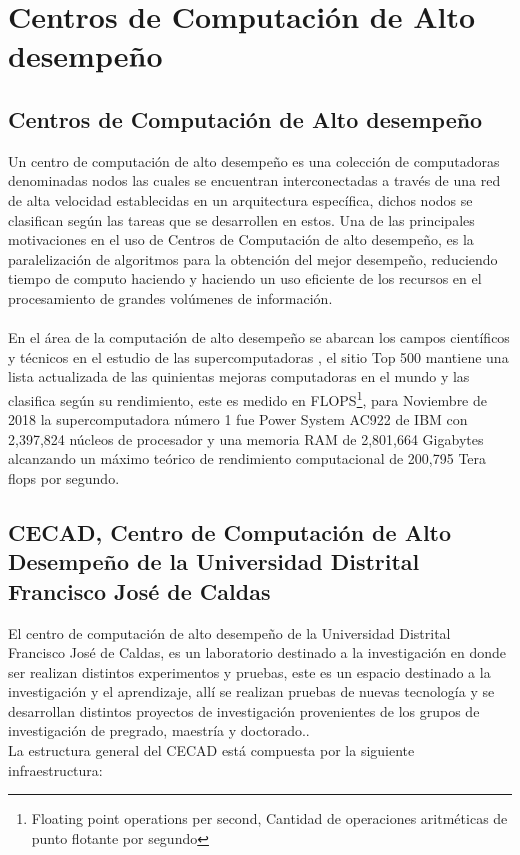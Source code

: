 \chapter{Centros de Computación de Alto desempeño}

\section{Centros de Computación de Alto desempeño}
Un centro de computación de alto desempeño es una colección de computadoras denominadas nodos las cuales se encuentran interconectadas a través de una red de alta velocidad establecidas en un arquitectura específica, dichos nodos se clasifican según las tareas que se desarrollen en estos. Una de las principales motivaciones en el uso de Centros de Computación de alto desempeño, es la paralelización de algoritmos para la obtención del mejor desempeño, reduciendo tiempo de computo haciendo y haciendo un uso eficiente de los recursos en el procesamiento de grandes volúmenes de información.  
\\\\
En el área de la computación de alto desempeño se abarcan los campos científicos y técnicos en el estudio de las supercomputadoras \cite{nielsen_2016} , el sitio Top 500 \cite{top500_supercomputer_sites_2019} mantiene una lista actualizada de las quinientas mejoras computadoras en el mundo y las clasifica según su rendimiento, este es medido en FLOPS\footnote{Floating point operations per second, Cantidad de operaciones aritméticas de punto flotante por segundo}, para Noviembre de 2018 la supercomputadora número 1 fue Power System AC922 de IBM con 2,397,824 núcleos de procesador y una memoria RAM de 2,801,664 Gigabytes alcanzando un máximo teórico de rendimiento computacional de 200,795 Tera flops por segundo.



\newpage

\section{CECAD, Centro de Computación de Alto Desempeño de la Universidad Distrital Francisco José de Caldas}

El centro de computación de alto desempeño de la Universidad Distrital Francisco José de Caldas, es un laboratorio destinado a la investigación en donde ser realizan distintos experimentos y pruebas, este es un espacio destinado a la investigación y el aprendizaje, allí se realizan pruebas de nuevas tecnología y se desarrollan distintos proyectos de investigación provenientes de los grupos de investigación de pregrado, maestría y doctorado.\cite{caliz_rodolfo_2019}.
\\
La estructura general del CECAD está compuesta por la siguiente infraestructura: 

